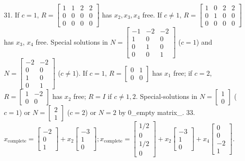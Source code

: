 
31. If \(c=1\), \(R=\begin{bmatrix}1&1&2&2\\ 0&0&0&0\\ 0&0&0&0\end{bmatrix}\) has \(x_{2},x_{3},x_{4}\) free. If \(c\neq 1\), \(R=\begin{bmatrix}1&0&2&2\\ 0&1&0&0\\ 0&0&0&0\end{bmatrix}\) has \(x_{3}\), \(x_{4}\) free. Special solutions in \(N=\begin{bmatrix}-1&-2&-2\\ 1&0&0\\ 0&1&0\\ 0&0&1\end{bmatrix}\) (\(c=1\)) and \(N=\begin{bmatrix}-2&-2\\ 0&0\\ 1&0\\ 0&1\end{bmatrix}\) (\(c\neq 1\)). If \(c=1\), \(R=\begin{bmatrix}0&1\\ 0&0\end{bmatrix}\) has \(x_{1}\) free; if \(c=2\), \(R=\begin{bmatrix}1&-2\\ 0&0\end{bmatrix}\) has \(x_{2}\) free; \(R=I\) if \(c\neq 1,2\). Special-solutions in \(N=\begin{bmatrix}1\\ 0\end{bmatrix}\) (\(c=1\)) or \(N=\begin{bmatrix}2\\ 1\end{bmatrix}\) (\(c=2\)) or \(N=2\) by \(0\)_empty matrix_.
33. \(x_{\text{complete}}=\begin{bmatrix}-2\\ 0\\ 1\end{bmatrix}+x_{2}\begin{bmatrix}-3\\ 1\\ 0\end{bmatrix};x_{\text{complete}}=\begin{bmatrix}1/2\\ 0\\ 1/2\\ 0\end{bmatrix}+x_{2}\begin{bmatrix}-3\\ 1\\ 0\end{bmatrix}+x_{4}\begin{bmatrix}0\\ 0\\ -2\\ 1\end{bmatrix}\).
